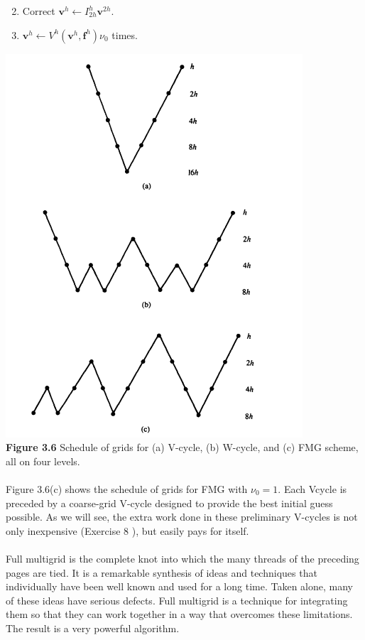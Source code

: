 \documentclass[11pt]{book}
\begin{document}
\begin{enumerate}
  \setcounter{enumi}{1}
  \item Correct $\mathbf{v}^{h} \leftarrow I_{2 h}^{h} \mathbf{v}^{2 h}$.

  \item $\mathbf{v}^{h} \leftarrow V^{h}\left(\mathbf{v}^{h}, \mathbf{f}^{h}\right) \nu_{0}$ times.

\end{enumerate}
\includegraphics[]{images/MMM.png}\\
\textbf{Figure 3.6} Schedule of grids for (a) V-cycle, (b) W-cycle, and (c) FMG scheme,
all on four levels.\\ \\
Figure 3.6(c) shows the schedule of grids for FMG with $\nu_{0}=1$. Each Vcycle is preceded by a coarse-grid $\mathrm{V}$-cycle designed to provide the best initial guess possible. As we will see, the extra work done in these preliminary V-cycles is not only inexpensive (Exercise 8 ), but easily pays for itself.\\ \\ 
Full multigrid is the complete knot into which the many threads of the preceding pages are tied. It is a remarkable synthesis of ideas and techniques that individually have been well known and used for a long time. Taken alone, many of these ideas have serious defects. Full multigrid is a technique for integrating them so that they can work together in a way that overcomes these limitations. The result is a very powerful algorithm.
\end{document}
